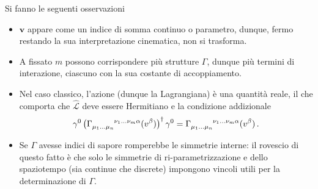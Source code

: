 \documentclass{article}
\begin{document}
Si fanno le seguenti osservazioni
\begin{itemize}
  \item $\mathbf{v}$ appare come un indice di somma continuo o parametro, dunque, fermo restando la sua interpretazione cinematica, non si trasforma.
  \item A fissato $m$ possono corrispondere più strutture $\Gamma$, dunque più termini di interazione, ciascuno con la sua costante di accoppiamento.
  \item Nel caso classico, l'azione (dunque la Lagrangiana) è una quantità reale, il che comporta che $\hat{\mathcal{L}}$ deve essere Hermitiano e la condizione addizionale
    \begin{equation}
     \gamma^0 \left( \Gamma\indices{_{\mu_1 \dots \mu_n}^{\nu_1 \dots \nu_m \alpha}}(v^\beta) \right)^\dagger \gamma^0 = \Gamma\indices{_{\mu_1 \dots \mu_n}^{\nu_1 \dots \nu_m \alpha}}(v^\beta) \, . 
     \label{eq:herm_constraint}
    \end{equation}
  \item Se $\Gamma$ avesse indici di sapore romperebbe le simmetrie interne: il rovescio di questo fatto è che solo le simmetrie di ri\hyp{}parametrizzazione e dello spaziotempo (sia continue che discrete) impongono vincoli utili per la determinazione di $\Gamma$.
\end{itemize}
\end{document}
